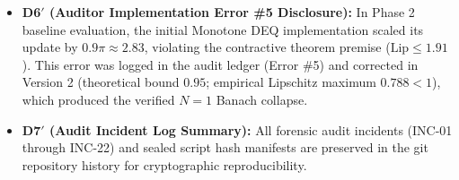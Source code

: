 \begin{itemize}
    \item \textbf{D6$'$ (Auditor Implementation Error \#5 Disclosure):} In Phase 2 baseline evaluation, the initial Monotone DEQ implementation scaled its update by $0.9\pi \approx 2.83$, violating the contractive theorem premise ($\text{Lip} \le 1.91$). This error was logged in the audit ledger (Error \#5) and corrected in Version 2 (theoretical bound $0.95$; empirical Lipschitz maximum $0.788 < 1$), which produced the verified $N=1$ Banach collapse.
    \item \textbf{D7$'$ (Audit Incident Log Summary):} All forensic audit incidents (INC-01 through INC-22) and sealed script hash manifests are preserved in the git repository history for cryptographic reproducibility.
\end{itemize}

